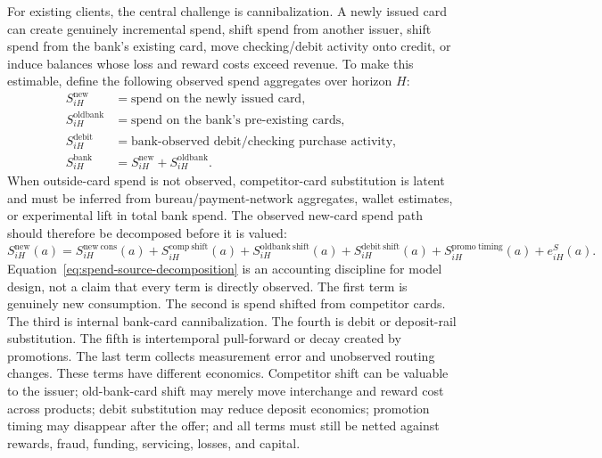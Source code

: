 \documentclass[11pt]{article}
\newcommand{\1}{\mathbf{1}}
\begin{document}
For existing clients, the central challenge is cannibalization. A newly issued
card can create genuinely incremental spend, shift spend from another issuer,
shift spend from the bank's existing card, move checking/debit activity onto
credit, or induce balances whose loss and reward costs exceed revenue. To make
this estimable, define the following observed spend aggregates over horizon
$H$:
\begin{align}
  S^{\mathrm{new}}_{iH}
    &= \text{spend on the newly issued card}, \\
  S^{\mathrm{oldbank}}_{iH}
    &= \text{spend on the bank's pre-existing cards}, \\
  S^{\mathrm{debit}}_{iH}
    &= \text{bank-observed debit/checking purchase activity}, \\
  S^{\mathrm{bank}}_{iH}
    &= S^{\mathrm{new}}_{iH}+S^{\mathrm{oldbank}}_{iH}.
\end{align}
When outside-card spend is not observed, competitor-card substitution is latent
and must be inferred from bureau/payment-network aggregates, wallet estimates,
or experimental lift in total bank spend. The observed new-card spend path
should therefore be decomposed before it is valued:
\begin{equation}
  S^{\mathrm{new}}_{iH}(a)
  =
  S^{\mathrm{new\ cons}}_{iH}(a)
  + S^{\mathrm{comp\ shift}}_{iH}(a)
  + S^{\mathrm{oldbank\ shift}}_{iH}(a)
  + S^{\mathrm{debit\ shift}}_{iH}(a)
  + S^{\mathrm{promo\ timing}}_{iH}(a)
  + e^{S}_{iH}(a).
  \label{eq:spend-source-decomposition}
\end{equation}
Equation~\eqref{eq:spend-source-decomposition} is an accounting discipline for
model design, not a claim that every term is directly observed. The first term
is genuinely new consumption. The second is spend shifted from competitor
cards. The third is internal bank-card cannibalization. The fourth is debit or
deposit-rail substitution. The fifth is intertemporal pull-forward or decay
created by promotions. The last term collects measurement error and unobserved
routing changes. These terms have different economics. Competitor shift can be
valuable to the issuer; old-bank-card shift may merely move interchange and
reward cost across products; debit substitution may reduce deposit economics;
promotion timing may disappear after the offer; and all terms must still be
netted against rewards, fraud, funding, servicing, losses, and capital.
\end{document}
